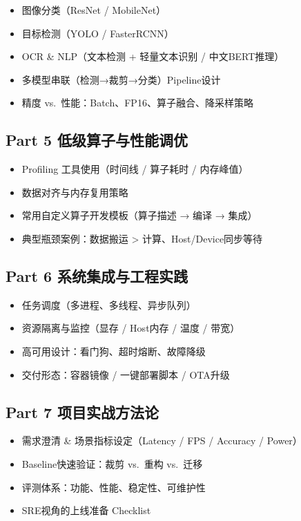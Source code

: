 \begin{itemize}
\tightlist
\item
  图像分类（ResNet / MobileNet）
\item
  目标检测（YOLO / FasterRCNN）
\item
  OCR \& NLP（文本检测 + 轻量文本识别 / 中文BERT推理）
\item
  多模型串联（检测→裁剪→分类）Pipeline设计
\item
  精度 vs.~性能：Batch、FP16、算子融合、降采样策略
\end{itemize}

\subsection{Part 5
低级算子与性能调优}\label{part-5-ux4f4eux7ea7ux7b97ux5b50ux4e0eux6027ux80fdux8c03ux4f18}

\begin{itemize}
\tightlist
\item
  Profiling 工具使用（时间线 / 算子耗时 / 内存峰值）
\item
  数据对齐与内存复用策略
\item
  常用自定义算子开发模板（算子描述 → 编译 → 集成）
\item
  典型瓶颈案例：数据搬运 \textgreater{} 计算、Host/Device同步等待
\end{itemize}

\subsection{Part 6
系统集成与工程实践}\label{part-6-ux7cfbux7edfux96c6ux6210ux4e0eux5de5ux7a0bux5b9eux8df5}

\begin{itemize}
\tightlist
\item
  任务调度（多进程、多线程、异步队列）
\item
  资源隔离与监控（显存 / Host内存 / 温度 / 带宽）
\item
  高可用设计：看门狗、超时熔断、故障降级
\item
  交付形态：容器镜像 / 一键部署脚本 / OTA升级
\end{itemize}

\subsection{Part 7
项目实战方法论}\label{part-7-ux9879ux76eeux5b9eux6218ux65b9ux6cd5ux8bba}

\begin{itemize}
\tightlist
\item
  需求澄清 \& 场景指标设定（Latency / FPS / Accuracy / Power）
\item
  Baseline快速验证：裁剪 vs.~重构 vs.~迁移
\item
  评测体系：功能、性能、稳定性、可维护性
\item
  SRE视角的上线准备 Checklist
\end{itemize}

